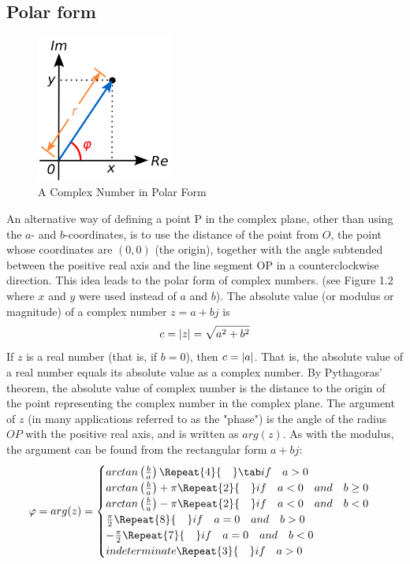 \documentclass[12pt,oneside,openany]{memoir}
\numberwithin{equation}{subsection}
\DeclarePairedDelimiter{\abs}{\lvert}{\rvert}
\newcommand{\quads}[1]{\Repeat{#1}{\quad}}
\begin{document}
\subsection{Polar form}
\begin{figure}
\centering
\captionsetup{justification=centering}
\includegraphics[width=0.4\textwidth]{images/complex_number_polar_form.png}
\caption{A Complex Number in Polar Form}
\end{figure}
An alternative way of defining a point P in the complex plane, other than using the \(a\)- and \(b\)-coordinates, is to use the distance of the point from \(O\), the point whose coordinates are \((0, 0)\) (the origin), together with the angle subtended between the positive real axis and the line segment OP in a counterclockwise direction. This idea leads to the polar form of complex numbers. (see Figure 1.2 where \(x\) and \(y\) were used instead of \(a\) and \(b\)).
\bigbreak
The absolute value (or modulus or magnitude) of a complex number \(z = a + bj\) is
\[c = \abs{z} = \sqrt{a^2 + b^2}\]
If \(z\) is a real number (that is, if \(b = 0\)), then \(c = \abs{a}\). That is, the absolute value of a real number equals its absolute value as a complex number. By Pythagoras' theorem, the absolute value of complex number is the distance to the origin of the point representing the complex number in the complex plane. 
\bigbreak
The argument of \(z\) (in many applications referred to as the "phase") is the angle of the radius \(OP\) with the positive real axis, and is written as \(arg(z)\). As with the modulus, the argument can be found from the rectangular form \(a + bj\):
\[
	\varphi =
	arg(z) =	\begin{cases}
				arctan\left(\frac{b}{a}\right) \quads{4} \tab if \quad a > 0\\
				arctan\left(\frac{b}{a}\right) + \pi \quads{2} if \quad a < 0 \quad and \quad b \geq 0\\
				arctan\left(\frac{b}{a}\right) - \pi \quads{2} if \quad a < 0 \quad and \quad b < 0\\
				\frac{\pi}{2} \quads{8} if \quad a = 0 \quad and \quad b > 0\\
				-\frac{\pi}{2} \quads{7}  if \quad a = 0 \quad and \quad b < 0\\
				indeterminate \quads{3} if \quad a > 0
			\end{cases}
\]
\end{document}
